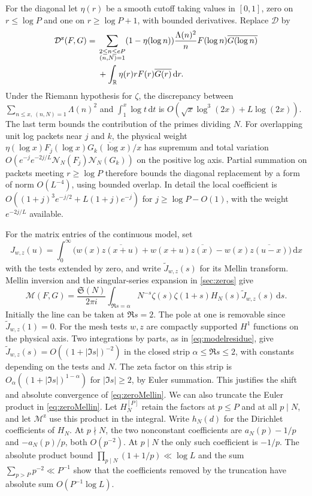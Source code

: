 \documentclass[11pt,a4paper]{article}
\numberwithin{equation}{section}
\newcommand{\SSS}{\mathfrak S}
\newcommand{\ud}{\mathrm d}
\newcommand{\NN}{\mathcal N_N}
\begin{document}
For the diagonal let $\eta(r)$ be a smooth cutoff taking
values in $[0,1]$, zero on $r\le\log P$ and one on
$r\ge\log P+1$, with bounded derivatives. Replace
$\mathcal D$ by
\begin{align}
 \mathcal D^{\mathrm z}(F,G)
  ={}&\sum_{\substack{2\le n\le eP\\(n,N)=1}}
       (1-\eta(\log n))\frac{\Lambda(n)^2}{n}
                        F(\log n)\overline{G(\log n)}
             \notag\\
     &+\int_{\mathbb R}\eta(r)r F(r)\overline{G(r)}\,\ud r .
 \label{eq:fullzeroD}
\end{align}
Under the Riemann hypothesis for $\zeta$, the discrepancy
between $\sum_{n\le x,\ (n,N)=1}\Lambda(n)^2$ and
$\int_1^x\log t\,\ud t$ is
$O(\sqrt x\log^3(2x)+L\log(2x))$. The last term bounds
the contribution of the primes dividing $N$. For
overlapping unit log packets near $j$ and $k$,
the physical weight
$\eta(\log x)F_j(\log x)\overline{G_k(\log x)}/x$
has supremum and total variation
$O(e^{-j}e^{-2j/L}\NN(F_j)\NN(G_k))$ on the positive
log axis. Partial summation on packets meeting
$r\ge\log P$ therefore bounds the diagonal replacement
by a form of norm $O(L^{-4})$, using bounded overlap.
In detail the local coefficient is
$O((1+j)^3e^{-j/2}+L(1+j)e^{-j})$ for
$j\ge\log P-O(1)$, with the weight $e^{-2j/L}$ available.

For the matrix entries of the continuous model, set
\[
 J_{w,z}(u)=\int_0^\infty
       \bigl(w(x)\overline{z(x+u)}
              +w(x+u)\overline{z(x)}
              -w(x)\overline{z(u-x)}\bigr)\,\ud x
\]
with the tests extended by zero, and write
$\widetilde J_{w,z}(s)$ for its Mellin transform.
Mellin inversion and the singular-series expansion in
\cref{sec:zeros} give
\begin{equation}
 \mathcal M(F,G)
   =\frac{\SSS(N)}{2\pi i}\int_{\Re s=\alpha}
       N^{-s}\zeta(s)\zeta(1+s)H_N(s)
                        \widetilde J_{w,z}(s)\,\ud s .
 \label{eq:zeroMellin}
\end{equation}
Initially the line can be taken at $\Re s=2$. The pole
at one is removable since $\widetilde J_{w,z}(1)=0$.
For the mesh tests $w,z$ are compactly supported
$H^1$ functions on the physical axis. Two integrations
by parts, as in \cref{eq:modelresidue}, give
$\widetilde J_{w,z}(s)=O((1+|\Im s|)^{-2})$ in the
closed strip $\alpha\le\Re s\le 2$, with constants
depending on the tests and $N$. The zeta factor on this
strip is $O_\alpha((1+|\Im s|)^{1-\alpha})$ for
$|\Im s|\ge2$, by Euler summation. This justifies
the shift and absolute convergence of \cref{eq:zeroMellin}.
We can also truncate the Euler product in \cref{eq:zeroMellin}.
Let $H_N^{[P]}$ retain the factors at $p\le P$ and at all
$p\mid N$, and let $\mathcal M^{\mathrm z}$ use this
product in the integral. Write $h_N(d)$ for the Dirichlet
coefficients of $H_N$. At $p\nmid N$, the two nonconstant
coefficients are $a_N(p)-1/p$ and $-a_N(p)/p$, both
$O(p^{-2})$. At $p\mid N$ the only such coefficient is
$-1/p$. The absolute product bound
$\prod_{p\mid N}(1+1/p)\ll\log L$ and the sum
$\sum_{p>P}p^{-2}\ll P^{-1}$ show that the coefficients
removed by the truncation have absolute sum
$O(P^{-1}\log L)$.
\end{document}
